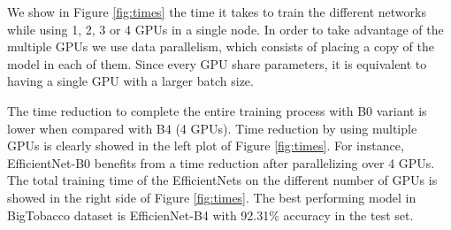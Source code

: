 \documentclass[runningheads]{llncs}
\begin{document}
We show in Figure \ref{fig:times} the time it takes to train the different networks while using 1, 2, 3 or 4 GPUs in a single node. In order to take advantage of the multiple GPUs we use data parallelism, which consists of placing a copy of the model in each of them. Since every GPU share parameters, it is equivalent to having a single GPU with a larger batch size.

\begin{comment}
\begin{table}
\caption{Time (hours) needed to train the EfficientNet models.}
\centering
\begin{tabular}{|c|c|c|c|c|}
\hline
\backslashbox{Model}{GPUs}
 & 1    & 2    & 3    & 4    \\ \hline
B0    & 13.33 & 6.81  & 4.58  & 3.4  \\ \hline
B1    & 19.44 & 9.81 & 6.81  & 4.94  \\ \hline
B2    & 20.55 & 10.22 & 6.92  & 5.16  \\ \hline
B3    & 25.64 & 12.94 & 8.78 & 6.55 \\ \hline
B4    & 34.28 & 17.36 & 11.69 & 8.75 \\ \hline
\end{tabular}
\label{hours}
\end{table}
\end{comment}

\begin{comment}
(As it can be seen, there is almost no difference in accuracy between EfficientNet models. In fact, even though EfficientNet-B0 has 5.2 million of parameters compared to 19 million of EfficientNet-B4, the accuracy obtained is very similar.)

(Furthermore, )
\end{comment}
The time reduction to complete the entire training process with B0 variant is  lower when compared with B4 (4 GPUs). Time reduction by using multiple GPUs is clearly showed in the left plot of Figure \ref{fig:times}. For instance, EfficientNet-B0 benefits from a  time reduction after parallelizing over 4 GPUs. The total training time of the EfficientNets on the different number of GPUs is showed in the right side of Figure \ref{fig:times}. The best performing model in BigTobacco dataset is EfficienNet-B4 with 92.31\% accuracy in the test set.

\begin{comment}
Note that the accuracy value of 92.31\% obtained in BigTobacco dataset have been achieved using Pytorch's DataParallel library, although the difference with DistributedDataParallel results is almost negligible.
\end{comment}
\end{document}
